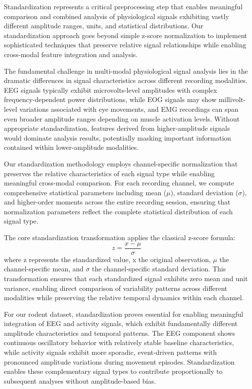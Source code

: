\documentclass[a4paper,12pt,twoside]{article}
\begin{document}
Standardization represents a critical preprocessing step that enables meaningful comparison and combined analysis of physiological signals exhibiting vastly different amplitude ranges, units, and statistical distributions. Our standardization approach goes beyond simple z-score normalization to implement sophisticated techniques that preserve relative signal relationships while enabling cross-modal feature integration and analysis.

The fundamental challenge in multi-modal physiological signal analysis lies in the dramatic differences in signal characteristics across different recording modalities. EEG signals typically exhibit microvolts-level amplitudes with complex frequency-dependent power distributions, while EOG signals may show millivolt-level variations associated with eye movements, and EMG recordings can span even broader amplitude ranges depending on muscle activation levels. Without appropriate standardization, features derived from higher-amplitude signals would dominate analysis results, potentially masking important information contained within lower-amplitude modalities.

Our standardization methodology employs channel-specific normalization that preserves the relative characteristics of each signal type while enabling meaningful cross-modal comparison. For each recording channel, we compute comprehensive statistical parameters including mean ($\mu$), standard deviation ($\sigma$), and higher-order moments across the entire recording session, ensuring that normalization parameters reflect the complete statistical distribution of each signal type.

The core standardization transformation applies the classical z-score formula:
\[
z = \frac{x - \mu}{\sigma}
\]
where z represents the standardized value, x the original observation, $\mu$ the channel-specific mean, and $\sigma$ the channel-specific standard deviation. This transformation ensures that each standardized signal exhibits zero mean and unit variance, enabling direct comparison of variability patterns across different modalities while preserving the relative temporal dynamics within each channel.

For our rodent dataset, standardization proves essential for enabling meaningful integration of EEG and activity signals, which exhibit fundamentally different amplitude characteristics and temporal patterns. The EEG component shows continuous oscillatory behavior with relatively stable baseline characteristics, while activity signals exhibit more sporadic, event-driven patterns with pronounced amplitude variations during movement episodes. Standardization enables these complementary signal types to contribute proportionally to subsequent analyses without amplitude-based bias.
\end{document}
